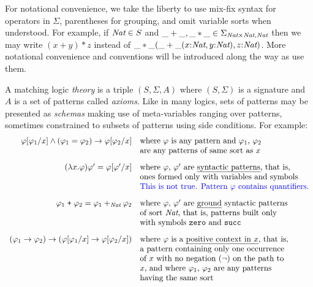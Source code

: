 \documentclass[UTF8]{article}
\theoremstyle{plain}
\theoremstyle{definition}
\theoremstyle{remark}
\newcommand{\cln}{{:}}
\begin{document}
For notational convenience, we take the liberty to use mix-fix syntax for
operators in $\Sigma$,
parentheses for grouping, and omit variable sorts when understood.
For example, if $\textit{Nat} \in S$ and
$\_+\_, \_*\_ \in \Sigma_{\textit{Nat} \times \textit{Nat}, \textit{Nat}}$
then we may write $(x + y)*z$ instead of
$\_*\_(\_+\_(x\cln\Nat,y\cln\Nat),z\cln\Nat)$.
More notational convenience and conventions will be introduced along the way as use them. 

A matching logic \emph{theory} is a triple $(S, \Sigma, A)$ where
$(S,\Sigma)$ is a signature and $A$ is a set of patterns called \emph{axioms}.
Like in many logics, sets of patterns may be presented as \emph{schemas}
making use of meta-variables ranging over patterns, sometimes constrained
to subsets of patterns using side conditions.
For example:
$$
\begin{array}{rl}
\varphi[\varphi_1/x] \wedge (\varphi_1 = \varphi_2) \rightarrow \varphi[\varphi_2/x]
&\textrm{where $\varphi$ is any pattern and $\varphi_1$, $\varphi_2$} \\
& \textrm{are any patterns of same sort as $x$}
\\[2ex]
(\lambda x . \varphi)\varphi' = \varphi[\varphi'/x]
& \textrm{where $\varphi$, $\varphi'$ are \emph{syntactic patterns}, that is,}
\\
& \textrm{ones formed only with variables and symbols}
\\
& \textrm{\color{blue} This is not true. Pattern $\varphi$ contains quantifiers.}
\\[2ex]
\varphi_1 \mathrel{\texttt{+}} \varphi_2 = \varphi_1 +_{\textit{Nat}} \varphi_2
& \textrm{where $\varphi$, $\varphi'$ are \emph{ground} syntactic patterns}
\\
&\textrm{of sort $\textit{Nat}$, that is, patterns built only}
\\
&\textrm{with symbols \texttt{zero} and \texttt{succ}}
\\[2ex]
(\varphi_1 \rightarrow \varphi_2) \rightarrow
(\varphi[\varphi_1 / x] \rightarrow \varphi[\varphi_2 / x])
& \textrm{where $\varphi$ is a \emph{positive context in $x$}, that is,}
\\
& \textrm{a pattern
containing only one occurrence}
\\
&\textrm{of $x$ with no negation ($\neg$) on the path to}
\\
&\textrm{$x$, and where $\varphi_1$, $\varphi_2$ are any patterns}
\\
&\textrm{having the same sort}
\end{array}
$$
\end{document}
